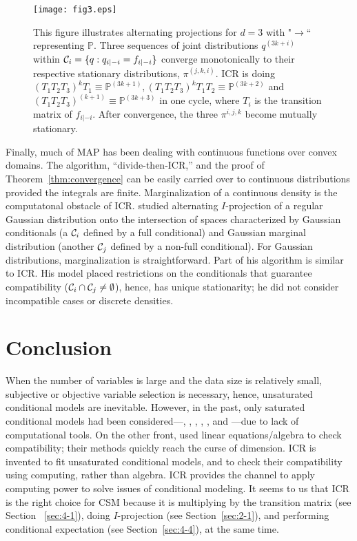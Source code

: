 \documentclass[12pt,a4paper]{article}
\begin{document}
\begin{figure}
\centering
\texttt{[image: fig3.eps]}
\caption{\small This figure  illustrates alternating projections for $d=3$ with "$\rightarrow$`` representing ${\mathbb P}$.
Three sequences of joint distributions $q^{(3k+i)}$ within ${\cal C}_i=\{q: q_{i|-i}=f_{i|-i}\}$ converge monotonically to their respective stationary distributions, $\pi^{(j,k,i)}$.  ICR is doing $(T_1 T_2 T_3)^{k} T_1\equiv {\mathbb P}^{(3k+1)}, (T_1 T_2 T_3)^{k} T_1 T_2\equiv {\mathbb P}^{(3k+2)}$ and  $(T_1 T_2 T_3)^{(k+1)}\equiv {\mathbb P}^{(3k+3)}$ in one cycle, where $T_i$ is the transition matrix of $f_{i|-i}$. After convergence, the three $\pi^{i,j,k}$ become mutually stationary.  \label{fig:3}}
\end{figure}

Finally, much of MAP has been dealing with continuous functions over convex domains.   The algorithm, ``divide-then-ICR,'' and the proof of Theorem~\ref{thm:convergence} can be easily carried over to continuous distributions provided the integrals are finite.   Marginalization of a continuous density is the computatonal obstacle of ICR.  \citet{Cramer1998} studied alternating $I$-projection of a regular Gaussian distribution onto the  intersection of spaces characterized by Gaussian conditionals (a ${\cal C}_i$ defined by a full conditional) and Gaussian marginal distribution (another ${\cal C}_j$ defined by a non-full conditional).  For Gaussian distributions, marginalization is straightforward.  Part of his algorithm \citep[Eq.~2.3]{Cramer1998}
is similar to ICR.  His model placed restrictions on the conditionals that guarantee compatibility (${\cal C}_i \cap {\cal C}_j \ne \emptyset$), hence, has unique stationarity; he did not consider incompatible cases or discrete densities.

\section{Conclusion}\label{sec:5}
When the number of variables is large and the  data size is relatively small, subjective or objective variable selection is necessary, hence, unsaturated conditional models are inevitable.  However,
in the past, only saturated conditional models had been considered---\citet{Besag1974}, \citet{Diaconis2010}, \citet{Kaiser2000}, \citet{Heckerman2000}, \citet{Wang2008}, \citet{Chen2013} and \citet{Kuo2019}---due to lack of computational tools.
On the other front, \citet{Arnold2002,Arnold2004} used linear equations/algebra to check compatibility;  their methods quickly reach the curse of dimension.
ICR is invented to fit unsaturated conditional models, and to check their compatibility using computing, rather than algebra.
ICR provides the channel to apply computing power to solve issues of conditional modeling.
It seems to us that ICR is the right choice for CSM because it is  multiplying by the transition matrix (see Section~ \ref{sec:4-1}), doing $I$-projection (see Section~\ref{sec:2-1}), and performing conditional expectation (see Section~\ref{sec:4-4}), at the same time.
\end{document}
